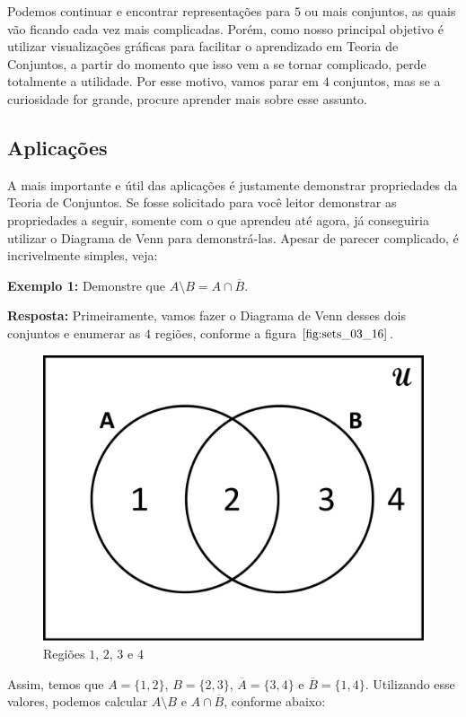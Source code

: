 Podemos continuar e encontrar representações para $5$ ou mais conjuntos, as quais vão ficando cada vez mais complicadas. Porém, como nosso principal objetivo é utilizar visualizações gráficas para facilitar o aprendizado em Teoria de Conjuntos, a partir do momento que isso vem a se tornar complicado, perde totalmente a utilidade. Por esse motivo, vamos parar em $4$ conjuntos, mas se a curiosidade for grande, procure aprender mais sobre esse assunto.

\subsection{Aplicações}
A mais importante e útil das aplicações é justamente demonstrar propriedades da Teoria de Conjuntos. Se fosse solicitado para você leitor demonstrar as propriedades a seguir, somente com o que aprendeu até agora, já conseguiria utilizar o Diagrama de Venn para demonstrá-las. Apesar de parecer complicado, é incrivelmente simples, veja:

\textbf{Exemplo 1:} Demonstre que $A \setminus B = A \cap \overline B$.

\textbf{Resposta:} Primeiramente, vamos fazer o Diagrama de Venn desses dois conjuntos e enumerar as $4$ regiões, conforme a figura $\ref{fig:sets_03_16}$.

\begin{figure}[ht!]
  \centering
  \includegraphics[scale=0.3]{figures/sets/fig_sets_03_16.pdf}
  \caption{Regiões $1$, $2$, $3$ e $4$}
  \label{fig:sets_03_16}
\end{figure}

Assim, temos que $A=\{1,2\}$, $B=\{2,3\}$, $\overline A=\{3,4\}$ e $\overline B=\{1,4\}$. Utilizando esse valores, podemos calcular $A \setminus B$ e $A \cap \overline B$, conforme abaixo:

